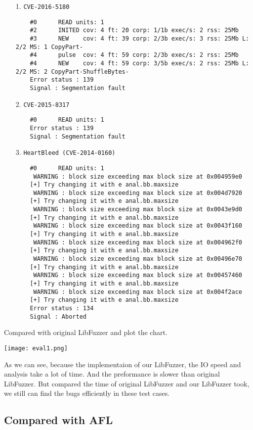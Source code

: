 \begin{enumerate}
    \item [1.] \texttt{CVE-2016-5180}
    \begin{lstlisting}
    #0      READ units: 1
    #2      INITED cov: 4 ft: 20 corp: 1/1b exec/s: 2 rss: 25Mb
    #3      NEW    cov: 4 ft: 39 corp: 2/3b exec/s: 3 rss: 25Mb L: 2/2 MS: 1 CopyPart-
    #4      pulse  cov: 4 ft: 59 corp: 2/3b exec/s: 2 rss: 25Mb
    #4      NEW    cov: 4 ft: 59 corp: 3/5b exec/s: 2 rss: 25Mb L: 2/2 MS: 2 CopyPart-ShuffleBytes-
    Error status : 139
    Signal : Segmentation fault
    \end{lstlisting}

    \item [2.] \texttt{CVE-2015-8317}
    \begin{lstlisting}
    #0      READ units: 1
    Error status : 139
    Signal : Segmentation fault
    \end{lstlisting}

    \item [3.] \texttt{HeartBleed (CVE-2014-0160)}
    \begin{lstlisting}
    #0      READ units: 1
     WARNING : block size exceeding max block size at 0x004959e0
    [+] Try changing it with e anal.bb.maxsize
     WARNING : block size exceeding max block size at 0x004d7920
    [+] Try changing it with e anal.bb.maxsize
     WARNING : block size exceeding max block size at 0x0043e9d0
    [+] Try changing it with e anal.bb.maxsize
     WARNING : block size exceeding max block size at 0x0043f160
    [+] Try changing it with e anal.bb.maxsize
     WARNING : block size exceeding max block size at 0x004962f0
    [+] Try changing it with e anal.bb.maxsize
     WARNING : block size exceeding max block size at 0x00496e70
    [+] Try changing it with e anal.bb.maxsize
     WARNING : block size exceeding max block size at 0x00457460
    [+] Try changing it with e anal.bb.maxsize
     WARNING : block size exceeding max block size at 0x004f2ace
    [+] Try changing it with e anal.bb.maxsize
    Error status : 134
    Signal : Aborted
    \end{lstlisting}

\end{enumerate}

Compared with original LibFuzzer and plot the chart.

\texttt{[image: eval1.png]}

As we can see, because the implementaion of our LibFuzzer, the IO speed and analysis take a lot of time. And the preformance is slower than original LibFuzzer. But compared the time of original LibFuzzer and our LibFuzzer took, we still can find the bugs efficiently in these test cases.

\subsection{Compared with AFL}


